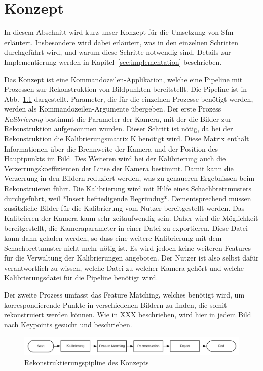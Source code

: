 
\chapter{Konzept}
In diesem Abschnitt wird kurz unser Konzept für die Umsetzung von Sfm erläutert. 
Insbesondere wird dabei erläutert, was in den einzelnen Schritten durchgeführt wird, und warum diese Schritte notwendig sind.
Details zur Implementierung werden in Kapitel~\ref{sec:implementation} beschrieben.

Das Konzept ist eine Kommandozeilen-Applikation, welche eine Pipeline mit Prozessen zur Rekonstruktion von Bildpunkten bereitstellt.
Die Pipeline ist in Abb.~\ref{fig:concept-pipeline} dargestellt.
Parameter, die für die einzelnen Prozesse benötigt werden, werden als Kommandozeilen-Argumente übergeben.
Der erste Prozess \emph{Kalibrierung} bestimmt die Parameter der Kamera, mit der die Bilder zur Rekonstruktion aufgenommen wurden.
Dieser Schritt ist nötig, da bei der Rekonstruktion die Kalibrierungsmatrix K benötigt wird.
Diese Matrix enthält Informationen über die Brennweite der Kamera und der Position des Hauptpunkts im Bild.
Des Weiteren wird bei der Kalibrierung auch die Verzerrungskoeffizienten der Linse der Kamera bestimmt. %
Damit kann die Verzerrung in den Bildern reduziert werden, was zu genaueren Ergebnissen beim Rekonstruieren führt.%
Die Kalibrierung wird mit Hilfe eines Schachbrettmusters durchgeführt, weil *Insert befriedigende Begründug*.
Dementsprechend müssen zusätzliche Bilder für die Kalibrierung vom Nutzer bereitgestellt werden.
Das Kalibrieren der Kamera kann sehr zeitaufwendig sein.
Daher wird die Möglichkeit bereitgestellt, die Kameraparameter in einer Datei zu exportieren.
Diese Datei kann dann geladen werden, so dass eine weitere Kalibrierung mit dem Schachbrettmuster nicht mehr nötig ist. 
Es wird jedoch keine weiteren Features für die Verwaltung der Kalibrierungen angeboten.
Der Nutzer ist also selbst dafür verantwortlich zu wissen, welche Datei zu welcher Kamera gehört und welche Kalibrierungsdatei für die Pipeline benötigt wird. 

Der zweite Prozess umfasst das Feature Matching, welches benötigt wird, um korrespondierende Punkte in verschiedenen Bildern zu finden, die somit rekonstruiert werden können.
Wie in XXX beschrieben, wird hier in jedem Bild nach Keypoints gesucht und beschrieben.








\begin{figure}
    \centering
    \includegraphics{src/img/konzept-pipeline-horizontal.png}
    \caption{Rekonstruktierungspipline des Konzepts}
    \label{fig:concept-pipeline}
\end{figure}

